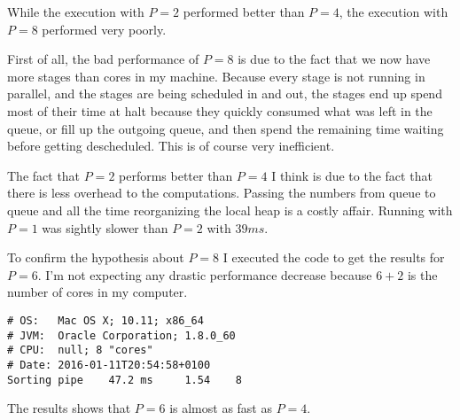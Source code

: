 \documentclass{ituhandin}
\begin{document}
While the execution with $P = 2$ performed better than $P = 4$, the execution with $P = 8$ performed very poorly.

First of all, the bad performance of $P = 8$ is due to the fact that we now have more stages than cores in my machine. Because every stage is not running in parallel, and the stages are being scheduled in and out, the stages end up spend most of their time at halt because they quickly consumed what was left in the queue, or fill up the outgoing queue, and then spend the remaining time waiting before getting descheduled. This is of course very inefficient. 

The fact that $P = 2$ performs better than $P = 4$ I think is due to the fact that there is less overhead to the computations. Passing the numbers from queue to queue and all the time reorganizing the local heap is a costly affair. Running with $P = 1$ was sightly slower than $P = 2$ with $39ms$.

To confirm the hypothesis about $P = 8$ I executed the code to get the results for $P = 6$. I'm not expecting any drastic performance decrease because $6+2$ is the number of cores in my computer. 

\begin{lstlisting}[language={},frame={}]
# OS:   Mac OS X; 10.11; x86_64
# JVM:  Oracle Corporation; 1.8.0_60
# CPU:  null; 8 "cores"
# Date: 2016-01-11T20:54:58+0100
Sorting pipe    47.2 ms     1.54    8
\end{lstlisting}

The results shows that $P = 6$ is almost as fast as $P = 4$.

\chapter{} %
\end{document}
